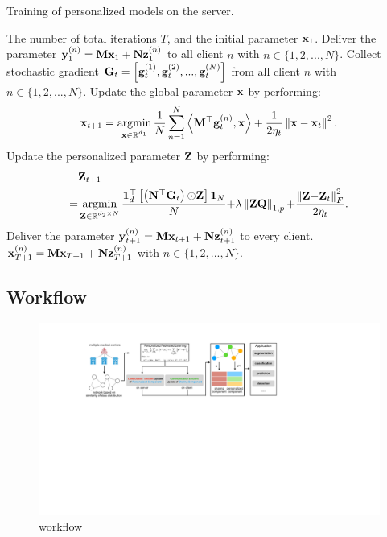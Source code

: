 \documentclass[journal]{IEEEtran}
\newcommand\algotext[1]{\end{algorithmic}#1\begin{algorithmic}[1]}
\begin{document}
\begin{algorithm}[!]
    \caption{Training of personalized models on the server.}
    \label{algo_xxx}
    \begin{algorithmic}[1]
        \Require The number of total iterations $T$, and the initial parameter ${\bf x}_1$.
        \State Deliver the parameter ${\bf y}_1^{(n)} = {\bf M}{\bf x}_1 + {\bf N}{\bf z}_1^{(n)}$ to all client $n$ with $n\in\{1,2, ..., N\}$.
            \State Collect stochastic gradient ${\bf G}_t = \left [ {\bf g}_t^{(1)}, {\bf g}_t^{(2)}, ..., {\bf g}_t^{(N)} \right ]$ from all client $n$ with $n\in\{1,2, ..., N\}$.
            \State Update the global parameter ${\bf x}$ by performing:
            $$ \x_{t+1} = \argmin_{\substack{\x\in\RR^{d_1}}} \frac{1}{N}\sum_{n=1}^N \lrangle{\M^\top\g_t^{(n)}, \x} + \frac{1}{2\eta_t}\lrnorm{\x - \x_t}^2.$$
            \State Update the personalized parameter ${\bf Z}$ by performing:
            \begin{align}
            \nonumber
            &\Z_{t+1} \\ \nonumber
            \mathrm{=} & \argmin_{\substack{\Z\in\RR^{d_2\mathrm{\times} N}}} \frac{\1_d^\top\left[\lrincir{\N^\top\G_t} \mathrm{\odot} \Z\right]\1_N}{N} \mathrm{+} \lambda \lrnorm{\Z\Q}_{1,p} \mathrm{+} \frac{\lrnorm{\Z \mathrm{-} \Z_t}_F^2}{2\eta_t}.
            \end{align}
            \State Deliver the parameter ${\bf y}_{t+1}^{(n)} = {\bf M}{\bf x}_{t+1} + {\bf N}{\bf z}_{t+1}^{(n)}$ to every client.
        \EndFor
        \Return ${\bf x}_{T+1}^{(n)} = {\bf M}{\bf x}_{T+1} + {\bf N}{\bf z}_{T+1}^{(n)}$ with $n\in\{1,2, ..., N\}$.
      \end{algorithmic}
\end{algorithm} 

\subsection{Workflow}


\begin{figure}[!t]
\setlength{\abovecaptionskip}{0pt}
\setlength{\belowcaptionskip}{0pt}
\centering 
\includegraphics[width=1.98\columnwidth]{figs/figs_workflow}
\caption{workflow}
\label{figure_xxx}
\end{figure}
\end{document}
